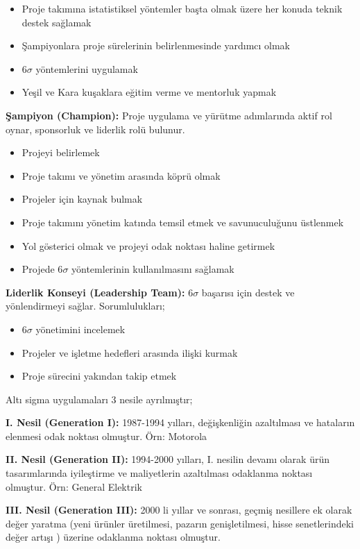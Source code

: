 \documentclass[
]{book}
\providecommand{\tightlist}{%
  \setlength{\itemsep}{0pt}\setlength{\parskip}{0pt}}
\begin{document}
\begin{itemize}
\tightlist
\item
  Proje takımına istatistiksel yöntemler başta olmak üzere her konuda teknik destek sağlamak
\item
  Şampiyonlara proje sürelerinin belirlenmesinde yardımcı olmak
\item
  6\(\sigma\) yöntemlerini uygulamak
\item
  Yeşil ve Kara kuşaklara eğitim verme ve mentorluk yapmak
\end{itemize}

\textbf{Şampiyon (Champion):} Proje uygulama ve yürütme adımlarında aktif rol oynar, sponsorluk ve liderlik rolü bulunur.

\begin{itemize}
\tightlist
\item
  Projeyi belirlemek
\item
  Proje takımı ve yönetim arasında köprü olmak
\item
  Projeler için kaynak bulmak
\item
  Proje takımını yönetim katında temsil etmek ve savunuculuğunu üstlenmek
\item
  Yol gösterici olmak ve projeyi odak noktası haline getirmek
\item
  Projede 6\(\sigma\) yöntemlerinin kullanılmasını sağlamak
\end{itemize}

\textbf{Liderlik Konseyi (Leadership Team):} 6\(\sigma\) başarısı için destek ve yönlendirmeyi sağlar. Sorumlulukları;

\begin{itemize}
\tightlist
\item
  6\(\sigma\) yönetimini incelemek
\item
  Projeler ve işletme hedefleri arasında ilişki kurmak
\item
  Proje sürecini yakından takip etmek
\end{itemize}

Altı sigma uygulamaları 3 nesile ayrılmıştır;

\textbf{I. Nesil (Generation I):} 1987-1994 yılları, değişkenliğin azaltılması ve hataların elenmesi odak noktası olmuştur. Örn: Motorola

\textbf{II. Nesil (Generation II):} 1994-2000 yılları, I. nesilin devamı olarak ürün tasarımlarında iyileştirme ve maliyetlerin azaltılması odaklanma noktası olmuştur. Örn: General Elektrik

\textbf{III. Nesil (Generation III):} 2000 li yıllar ve sonrası, geçmiş nesillere ek olarak değer yaratma (yeni ürünler üretilmesi, pazarın genişletilmesi, hisse senetlerindeki değer artışı ) üzerine odaklanma noktası olmuştur.
\end{document}
